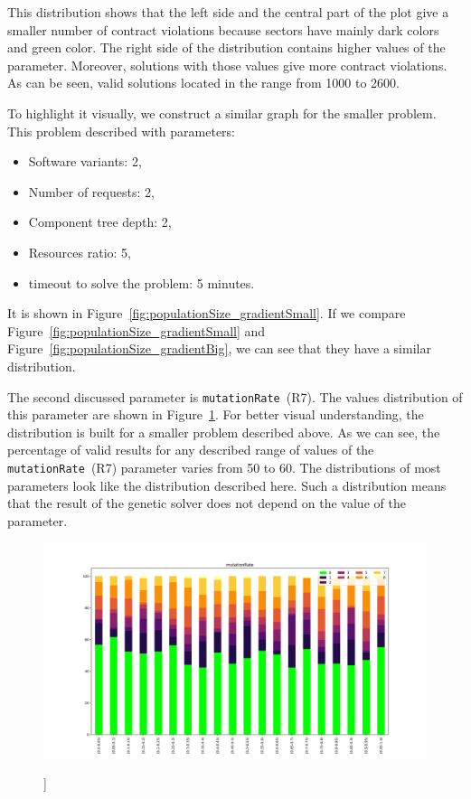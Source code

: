 This distribution shows that the left side and the central part of the plot give a smaller number of contract violations because sectors have mainly dark colors and green color. The right side of the distribution contains higher values of the parameter. Moreover, solutions with those values give more contract violations. As can be seen, valid solutions located in the range from 1000 to 2600.

To highlight it visually, we construct a similar graph for the smaller problem. This problem described with parameters:
\begin{itemize}
	\item Software variants: 2,
	\item Number of requests: 2,
	\item Component tree depth: 2,
	\item Resources ratio: 5,
	\item timeout to solve the problem: 5 minutes.
\end{itemize}

It is shown in Figure~\ref{fig:populationSize_gradientSmall}. If we compare Figure~\ref{fig:populationSize_gradientSmall} and Figure~\ref{fig:populationSize_gradientBig}, we can see that they have a similar distribution.

The second  discussed parameter is \texttt{mutationRate}~(R7). The values distribution of this parameter are shown in Figure~\ref{fig:mutationRate_gradient}. For better visual understanding, the distribution is built for a smaller problem described above. 
As we can see, the percentage of valid results for any described range of values of the \texttt{mutationRate}~(R7) parameter varies from 50 to 60. The distributions of most parameters look like the distribution described here. Such a distribution means that the result of the genetic solver does not depend on the value of the parameter. 

\begin{figure}
	\centering
	\includegraphics[width=\textwidth]{images/mutationRate_gradient_500dpi.png}
	\caption[]]{}
	\label{fig:mutationRate_gradient}
\end{figure}

